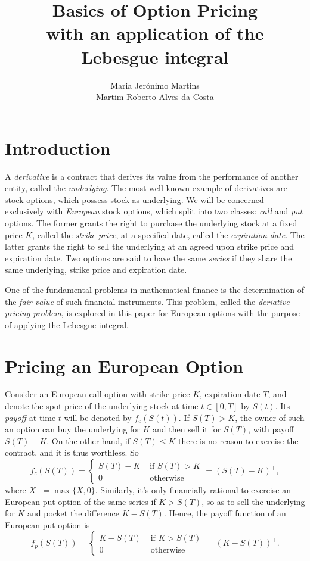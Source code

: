 \documentclass[]{article}
\title{%
	Basics of Option Pricing\\
	\large with an application of the Lebesgue integral}
\author{Maria Jerónimo Martins \\ Martim Roberto Alves da Costa}
\theoremstyle{definition}
\theoremstyle{remark}
\begin{document}
\maketitle

\section{Introduction}
A \textit{derivative} is a contract that derives its value from the performance of another entity, called the \textit{underlying}. The most well-known example of derivatives are stock options, which possess stock as underlying. We will be concerned exclusively with \textit{European} stock options, which split into two classes: \textit{call} and \textit{put} options. The former grants the right to purchase the underlying stock at a fixed price $K$, called the \textit{strike price}, at a specified date, called the \textit{expiration date}.
	The latter grants the right to sell the underlying at an agreed upon strike price and expiration date. Two options are said to have the same \textit{series} if they share the same underlying, strike price and expiration date.
	\par One of the fundamental problems in mathematical finance is the determination of the \textit{fair value} of such financial instruments. This problem, called the \textit{deriative pricing problem}, is explored in this paper for European options with the purpose of applying the Lebesgue integral.

\section{Pricing an European Option}
Consider an European call option with strike price $K$, expiration date $T$, and denote the spot price of the underlying stock at time $t \in [0, T]$ by $S(t)$. Its \textit{payoff} at time $t$ will be denoted by $f_c(S(t))$. If $S(T) > K$, the owner of such an option can buy the underlying for $K$ and then sell it for $S(T)$, with payoff $S(T) - K$. On the other hand, if $S(T) \leq K$ there is no reason to exercise the contract, and it is thus worthless. So
\[
f_c(S(T)) = 
\begin{cases}
S(T) - K &\text{ if } S(T) > K \\
0 &\text{ otherwise}
\end{cases}
= (S(T) - K)^+,
\]
where $X^+ = \max\{X, 0 \} $. Similarly, it's only financially rational to exercise an European put option of the same series if $K > S(T)$, so as to sell the underlying for $K$ and pocket the difference $K - S(T)$.  Hence, the payoff function of an European put option is
\[
f_p(S(T)) = 
\begin{cases}
	K - S(T) &\text{ if } K > S(T) \\
	0 &\text{ otherwise}
\end{cases}
= (K- S(T))^+.
\]
\end{document}
